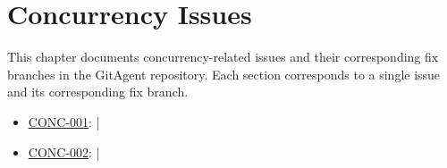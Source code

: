 \chapter{Concurrency Issues}
\label{chap:conc}

This chapter documents concurrency-related issues and their corresponding fix branches in the GitAgent repository. Each section corresponds to a single issue and its corresponding fix branch.

\begin{itemize}
    \item \hyperref[sec:conc-001]{CONC-001}:  | 
    \item \hyperref[sec:conc-002]{CONC-002}:  | 
\end{itemize}




